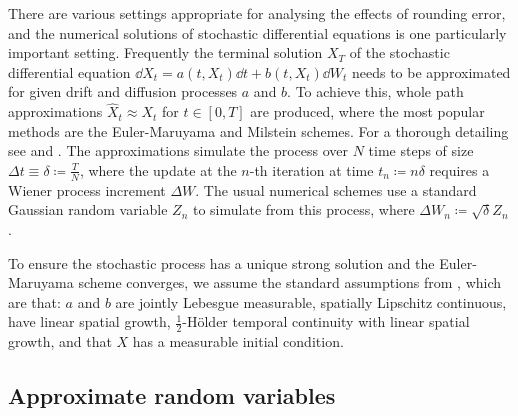 \documentclass[manuscript,review]{acmart}
\begin{document}
There are various settings appropriate for analysing the effects of rounding error, and the numerical solutions of stochastic differential equations is one particularly important setting. Frequently the terminal solution $ X_T $ of the stochastic differential equation $ \dd{X_t} = a(t, X_t) \dd{t} + b(t, X_t)\dd{W_t} $ needs to be approximated for given drift and diffusion processes $ a $ and $ b $. To achieve this, whole path approximations $ \widehat{X}_t \approx X_t $ for $ t \in [0, T] $ are produced, where the most popular methods are the Euler-Maruyama and Milstein schemes. For a thorough  detailing see \citet{kloeden1999numerical} and \citet{glasserman2013monte}. The approximations simulate the process over $ N $ time steps of size $ \Delta t \equiv \delta \coloneqq \tfrac{T}{N} $, where the update at the $ n $-th iteration at time $ t_n \coloneqq n\delta $ requires a Wiener process increment $ \Delta W $. The usual numerical schemes use a standard Gaussian random variable $ Z_n $ to simulate from this process, where $ \Delta W_n \coloneqq \sqrt{\delta} Z_n $. 

To ensure the stochastic process has a unique strong solution and the Euler-Maruyama scheme converges, we assume the standard assumptions from \citet[4.5]{kloeden1999numerical}, which are that: $ a $ and $ b $ are jointly Lebesgue measurable, spatially Lipschitz continuous, have linear spatial growth, $ \tfrac{1}{2} $-H\"{o}lder temporal continuity with linear spatial growth, and that $ X $ has a measurable initial condition.

\subsection{Approximate random variables}
\label{sec:approximate_random_variables}
\end{document}
